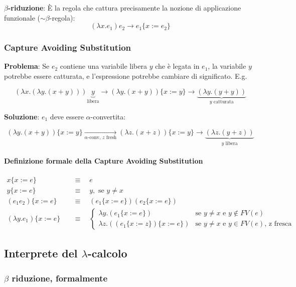\documentclass[a4paper,10pt]{article}
\begin{document}
 \textbf{$\beta$-riduzione}: È la regola che cattura precisamente la nozione di applicazione funzionale ($\sim \beta$-regola):
 \[ (\lambda x.e_1)e_2 \to  e_1 \{ x:=e_2 \}\]
 \subsubsection{Capture Avoiding Substitution}
 
 
 \textbf{Problema}: Se $e_2$ contiene una variabile libera $y$ che è legata in $e_1$, la variabile $y$ potrebbe essere catturata, e l'espressione potrebbe cambiare di significato. E.g.
 

 \[(\lambda x . (\lambda y.(x+y))) \underbrace{y}_\text{libera} \to (\lambda y.(x+y))\{ x := y \} \to\underbrace{(\lambda y.(y+y))}_\text{$y$ catturata} \]
 
\textbf{Soluzione}: $e_1$ deve essere $\alpha$-convertita:
 
\[(\lambda y.(x+y))\{ x := y \} \underset{\alpha\text{-conv, $z$ fresh}}\to (\lambda z.(x+z))\{ x := y \} \to \underbrace{(\lambda z.(y+z))}_\text{$y$ libera} \]

\paragraph{Definizione formale della Capture Avoiding Substitution}
\[\begin{aligned}
   x\{x := e\} \quad &\equiv\quad  e\\
   y\{x := e\} \quad &\equiv\quad  y, \text{ se } y \neq x\\
   (e_1 e_2)\{x := e\}\quad &\equiv\quad (e_1\{x:=e\})(e_2\{x:=e\})\\
   (\lambda y.e_1)\{ x:=e \}\quad &\equiv\quad  \begin{cases}
                                                    \lambda y.(e_1\{ x:=e \}) &\text{se $y \neq x$ e $y \notin FV(e)$}\\
                                                    \lambda z.((e_1\{ x:=z \})\{ x:=e \}) &\text{se $y \neq x$ e $y \in FV(e)$, z fresca}
                                               \end{cases}
  \end{aligned}
\]

 \newpage
\subsection{Interprete del $\lambda$-calcolo}
\subsubsection{$\beta$ riduzione, formalmente}
\end{document}
